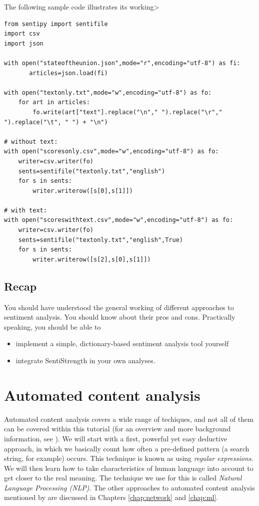\documentclass[a4paper,12pt]{book}
\begin{document}
The following sample code illustrates its working>

\begin{lstlisting}
from sentipy import sentifile
import csv
import json

with open("stateoftheunion.json",mode="r",encoding="utf-8") as fi:
       articles=json.load(fi)

with open("textonly.txt",mode="w",encoding="utf-8") as fo:
    for art in articles:
        fo.write(art["text"].replace("\n"," ").replace("\r"," ").replace("\t", " ") + "\n")

# without text:
with open("scoresonly.csv",mode="w",encoding="utf-8") as fo:
    writer=csv.writer(fo)
    sents=sentifile("textonly.txt","english")
    for s in sents:
        writer.writerow([s[0],s[1]]) 
 
# with text:      
with open("scoreswithtext.csv",mode="w",encoding="utf-8") as fo:
    writer=csv.writer(fo)
    sents=sentifile("textonly.txt","english",True)
    for s in sents:
        writer.writerow([s[2],s[0],s[1]]) 
\end{lstlisting}

\section{Recap}
You should have understood the general working of different approaches to sentiment analysis. You should know about their pros and cons. Practically speaking, you should be able to
\begin{itemize}
	\item implement a simple, dictionary-based sentiment analysis tool yourself
	\item integrate SentiStrength in your own analyses.
\end{itemize}

\chapter{Automated content analysis}
Automated content analysis covers a wide range of techiques, and not all of them can be covered within this tutorial (for an overview and more background information, see \cite{Boumans2016}). We will start with a first, powerful yet easy deductive approach, in which we basically count how often a pre-defined pattern (a search string, for example) occurs. This technique is known as using \emph{regular expressions}. We will then learn how to take characteristics of human language into account to get closer to the real meaning. The technique we use for this is called \emph{Natural Language Processing (NLP)}.
The other approaches to automated content analysis mentioned by \cite{Boumans2016} are discussed in Chapters \ref{chap:network} and \ref{chap:ml}.
\end{document}
